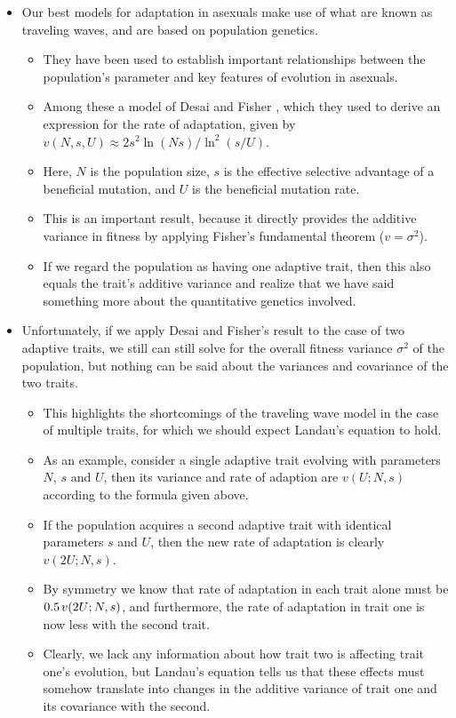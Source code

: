 \documentclass[11pt,one column]{article}
\begin{document}
\begin{itemize}
\item Our best models for adaptation in asexuals make use of what are known as traveling waves, and are based on population genetics.
\begin{itemize}
\item They have been used to establish important relationships between the population's parameter and key features of evolution in asexuals.
\item Among these a model of Desai and Fisher \cite{desai2007beneficial}, which they used to derive an expression for the rate of adaptation, given by $v(N,s,U) \approx 2s^2 \ln(N s)/\ln^2(s/U)$.
\item Here, $N$ is the population size, $s$ is the effective selective advantage of a beneficial mutation, and $U$ is the beneficial mutation rate.
\item This is an important result, because it directly provides the additive variance in fitness by applying Fisher's fundamental theorem ($v=\sigma^2$).
\item If we regard the population as having one adaptive trait, then this also equals the trait's additive variance and realize that we have said something more about the quantitative genetics involved.
\end{itemize}

\item Unfortunately, if we apply Desai and Fisher's result to the case of two adaptive traits, we still can still solve for the overall fitness variance $\sigma^2$ of the population, but nothing can be said about the variances and covariance of the two traits.
\begin{itemize}
\item This highlights the shortcomings of the traveling wave model in the case of multiple traits, for which we should expect Landau's equation to hold.
\item As an example, consider a single adaptive trait evolving with parameters $N$, $s$ and $U$, then its variance and rate of adaption are $v(U;N,s)$ according to the formula given above.
\item If the population acquires a second adaptive trait with identical parameters $s$ and $U$, then the new rate of adaptation is clearly $v(2U;N,s)$.
\item By symmetry we know that rate of adaptation in each trait alone must be $0.5 \hspace{.02 in} v(2U;N,s)$, and furthermore, the rate of adaptation in trait one is now less with the second trait.
\item Clearly, we lack any information about how trait two is affecting trait one's evolution, but Landau's equation tells us that these effects must somehow translate into changes in the additive variance of trait one and its covariance with the second.
\end{itemize}


\end{itemize}
\end{document}

